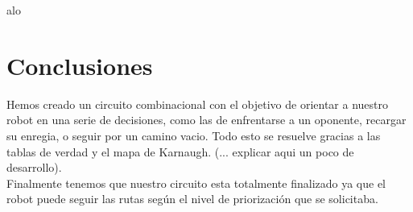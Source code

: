 \documentclass[a4paper]{article}
\begin{document}
alo

\section{Conclusiones}
Hemos creado un circuito combinacional con el objetivo de orientar a nuestro robot en una serie de decisiones, como las de enfrentarse a un oponente, recargar su enregia, o seguir por un camino vacio. Todo esto se resuelve gracias a las tablas de verdad y el mapa de Karnaugh. (... explicar aqui un poco de desarrollo).\\
Finalmente tenemos que nuestro circuito esta totalmente finalizado ya que el robot puede seguir las rutas según el nivel de priorización que se solicitaba.
\end{document}
